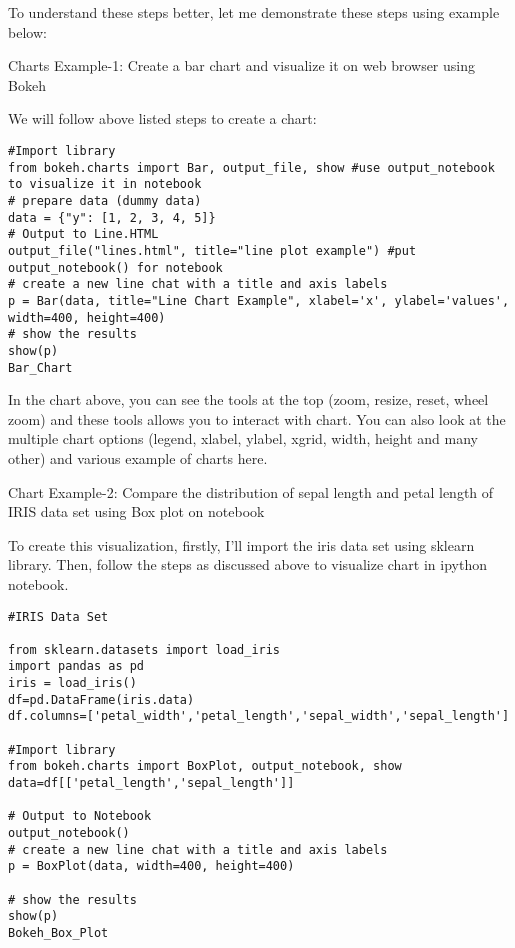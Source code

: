 To understand these steps better, let me demonstrate these steps using example below:

Charts Example-1: Create a bar chart and visualize it on web browser using Bokeh

We will follow above listed steps to create a chart:

\begin{framed}
\begin{verbatim}
#Import library
from bokeh.charts import Bar, output_file, show #use output_notebook to visualize it in notebook
# prepare data (dummy data)
data = {"y": [1, 2, 3, 4, 5]}
# Output to Line.HTML
output_file("lines.html", title="line plot example") #put output_notebook() for notebook
# create a new line chat with a title and axis labels
p = Bar(data, title="Line Chart Example", xlabel='x', ylabel='values', width=400, height=400)
# show the results
show(p)
Bar_Chart
\end{verbatim}
\end{framed}
In the chart above,  you can see the tools at the top (zoom, resize, reset, wheel zoom) and these 
tools allows you to interact with chart. 
You can also look at the multiple chart options (legend, xlabel, ylabel, xgrid, width, height and many other) and 
various example of charts here.



Chart Example-2: Compare the distribution of sepal length and petal length of IRIS data set using 
Box plot on notebook

To create this visualization, firstly, I’ll import the iris data set using sklearn library. Then, 
follow the steps as discussed above to visualize chart in ipython notebook.

\begin{framed}
\begin{verbatim}
#IRIS Data Set

from sklearn.datasets import load_iris
import pandas as pd
iris = load_iris()
df=pd.DataFrame(iris.data)
df.columns=['petal_width','petal_length','sepal_width','sepal_length']

#Import library
from bokeh.charts import BoxPlot, output_notebook, show
data=df[['petal_length','sepal_length']]

# Output to Notebook
output_notebook()
# create a new line chat with a title and axis labels
p = BoxPlot(data, width=400, height=400)

# show the results
show(p)
Bokeh_Box_Plot
\end{verbatim}
\end{framed}
 

